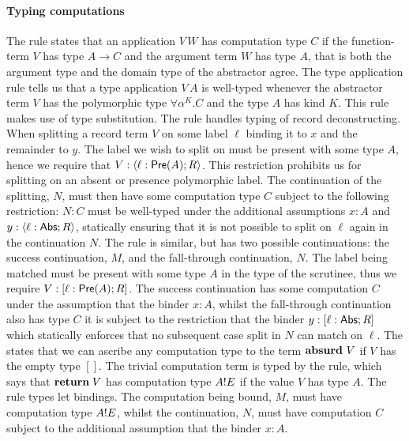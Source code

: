 \documentclass[12pt,phd,lfcs,twoside,openright,logo,leftchapter,normalheadings]{infthesis}
\theoremstyle{plain}
\theoremstyle{definition}
\begin{document}
\paragraph{Typing computations}
The  rule states that an application $V\,W$ has computation
type $C$ if the function-term $V$ has type $A \to C$ and the
argument term $W$ has type $A$, that is both the argument type and the
domain type of the abstractor agree.
%
The type application rule  tells us that a type
application $V\,A$ is well-typed whenever the abstractor term $V$ has
the polymorphic type $\forall \alpha^K.C$ and the type $A$ has kind
$K$. This rule makes use of type substitution.
%
The  rule handles typing of record deconstructing. When
splitting a record term $V$ on some label $\ell$ binding it to $x$ and
the remainder to $y$. The label we wish to split on must be present
with some type $A$, hence we require that
$V : \langle \ell : \mathsf{Pre}(A); R \rangle$. This restriction prohibits us for
splitting on an absent or presence polymorphic label.  The
continuation of the splitting, $N$, must then have some computation
type $C$ subject to the following restriction: $N : C$ must be
well-typed under the additional assumptions $x : A$ and
$y : \langle \ell : \mathsf{Abs}; R \rangle$, statically ensuring that it is not
possible to split on $\ell$ again in the continuation $N$.
%
The  rule is similar, but has two possible continuations:
the success continuation, $M$, and the fall-through continuation, $N$.
The label being matched must be present with some type $A$ in the type
of the scrutinee, thus we require $V : [\ell : \mathsf{Pre}(A);R]$. The
success continuation has some computation $C$ under the assumption
that the binder $x : A$, whilst the fall-through continuation also has
type $C$ it is subject to the restriction that the binder
$y : [\ell : \mathsf{Abs};R]$ which statically enforces that no subsequent
case split in $N$ can match on $\ell$.
%
The  states that we can ascribe any computation type to
the term $\mathbf{absurd}~V$ if $V$ has the empty type $[]$.
%
The trivial computation term is typed by the  rule,
which says that $\mathbf{return}\;V$ has computation type $A ! E$ if the
value $V$ has type $A$.
%
The  rule types let bindings. The computation being bound,
$M$, must have computation type $A ! E$, whilst the continuation,
$N$, must have computation $C$ subject to the additional assumption
that the binder $x : A$.
\end{document}
